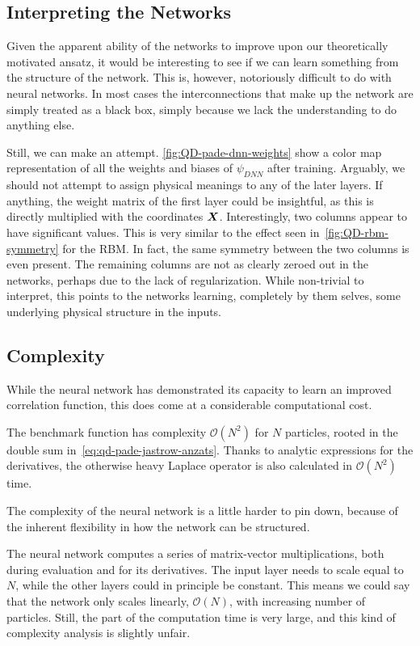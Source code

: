\documentclass[Thesis.tex]{subfiles}
\begin{document}
\subsection{Interpreting the Networks}

Given the apparent ability of the networks to improve upon our theoretically
motivated ansatz, it would be interesting to see if we can learn something from
the structure of the network. This is, however, notoriously difficult to do with
neural networks. In most cases the interconnections that make up the network are
simply treated as a black box, simply because we lack the understanding to do
anything else.

Still, we can make an attempt. \cref{fig:QD-pade-dnn-weights} show a color map
representation of all the weights and biases of $\psi_{DNN}$ after training.
Arguably, we should not attempt to assign physical meanings to any of the later
layers. If anything, the weight matrix of the first layer could be insightful,
as this is directly multiplied with the coordinates $\bm{X}$. Interestingly, 
two columns appear to have significant values. This is very similar to the
effect seen in~\cref{fig:QD-rbm-symmetry} for the RBM. In fact, the same
symmetry between the two columns is even present. The remaining columns are not
as clearly zeroed out in the networks, perhaps due to the lack of
regularization. While non-trivial to interpret, this points to the networks
learning, completely by them selves, some underlying physical structure in the
inputs. \\



\subsection{Complexity}

While the neural network has demonstrated its capacity to learn an improved
correlation function, this does come at a considerable computational cost.

The benchmark function has complexity $\mathcal{O}(N^2)$ for $N$ particles,
rooted in the double sum in~\cref{eq:qd-pade-jastrow-anzats}. Thanks to
analytic expressions for the derivatives, the otherwise heavy Laplace operator
is also calculated in $\mathcal{O}(N^2)$ time.

The complexity of the neural network is a little harder to pin down, because of
the inherent flexibility in how the network can be structured.

The neural network computes a series of matrix-vector multiplications, both during
evaluation and for its derivatives. The input layer needs to scale equal to $N$,
while the other layers could in principle be constant. This means we could say
that the network only scales linearly, $\mathcal{O}(N)$, with increasing number
of particles. Still, the  part of the computation time is very
large, and this kind of complexity analysis is slightly unfair.
\end{document}
